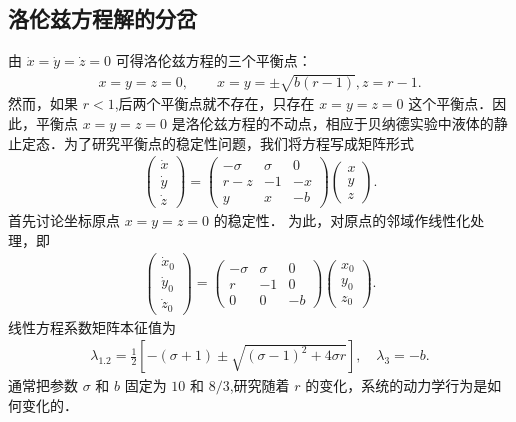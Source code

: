 \subsection{洛伦兹方程解的分岔}

由 $\dot{x}=\dot{y}=\dot{z}=0$ 可得洛伦兹方程的三个平衡点：
\begin{align}
x=y=z=0,\qquad x=y=\pm\sqrt{b(r-1)}, z=r-1.
\end{align}
然而，如果 $r<1$,后两个平衡点就不存在，只存在 $x=y=z=0$ 这个平衡点．因此，平衡点 $x=y=z=0$ 是洛伦兹方程的不动点，相应于贝纳德实验中液体的静止定态．为了研究平衡点的稳定性问题，我们将方程写成矩阵形式
\begin{align}
\left(\begin{array}{l}
\dot{x} \\
\dot{y} \\
\dot{z}
\end{array}\right)=\left(\begin{array}{ccc}
-\sigma & \sigma & 0 \\
r-z & -1 & -x \\
y & x & -b
\end{array}\right)\left(\begin{array}{l}
x \\
y \\
z
\end{array}\right) .
\end{align}
首先讨论坐标原点 $x=y=z=0$ 的稳定性． 为此，对原点的邻域作线性化处理，即
\begin{align}
\left(\begin{array}{l}
\dot{x}_{0} \\
\dot{y}_{0} \\
\dot{z}_{0}
\end{array}\right)=\left(\begin{array}{ccc}
-\sigma & \sigma & 0 \\
r & -1 & 0 \\
0 & 0 & -b
\end{array}\right)\left(\begin{array}{l}
x_{0} \\
y_{0} \\
z_{0}
\end{array}\right).
\end{align}
线性方程系数矩阵本征值为
\begin{align}
\lambda_{1.2}=\frac{1}{2}\left[-(\sigma+1) \pm \sqrt{(\sigma-1)^{2}+4 \sigma r}\right], \quad \lambda_{3}=-b.
\end{align}
通常把参数 $\sigma$ 和 $b$ 固定为 $10$ 和 $8/3$,研究随着 $r$ 的变化，系统的动力学行为是如何变化的．


